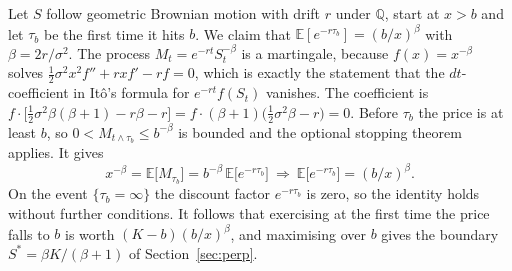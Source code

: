 Let $S$ follow geometric Brownian motion with drift $r$ under $\mathbb Q$, start at $x>b$ and let $\tau_b$ be the first time it hits $b$.
We claim that $\mathbb E[e^{-r\tau_b}]=(b/x)^{\beta}$ with $\beta=2r/\sigma^2$.
The process $M_t=e^{-rt}S_t^{-\beta}$ is a martingale, because $f(x)=x^{-\beta}$ solves $\tfrac12\sigma^2x^2f''+rxf'-rf=0$, which is exactly the statement that the $dt$-coefficient in It\^o's formula for $e^{-rt}f(S_t)$ vanishes.
The coefficient is $f\cdot\big[\tfrac12\sigma^2\beta(\beta+1)-r\beta-r\big]=f\cdot(\beta+1)\big(\tfrac12\sigma^2\beta-r\big)=0$.
Before $\tau_b$ the price is at least $b$, so $0<M_{t\wedge\tau_b}\le b^{-\beta}$ is bounded and the optional stopping theorem applies.
It gives
\begin{equation}
x^{-\beta}=\mathbb E\big[M_{\tau_b}\big]=b^{-\beta}\,\mathbb E\big[e^{-r\tau_b}\big]\ \Longrightarrow\ \mathbb E\big[e^{-r\tau_b}\big]=(b/x)^{\beta}.
\end{equation}
On the event $\{\tau_b=\infty\}$ the discount factor $e^{-r\tau_b}$ is zero, so the identity holds without further conditions.
It follows that exercising at the first time the price falls to $b$ is worth $(K-b)(b/x)^\beta$, and maximising over $b$ gives the boundary $S^*=\beta K/(\beta+1)$ of Section~\ref{sec:perp}.
